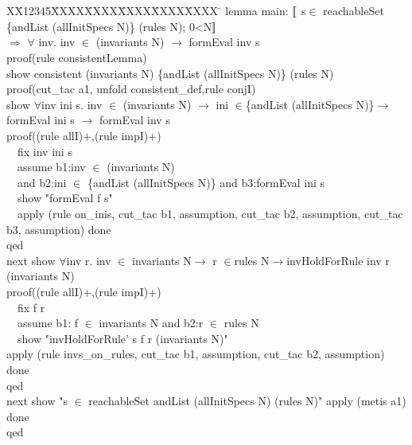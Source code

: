 \documentclass{llncs}
\newlength{\fminilength}
\newenvironment{fmini}[1][\linewidth]
  {\setlength{\fminilength}{#1\fboxsep-2\fboxrule}%
   \vspace{2ex}\noindent\begin{lrbox}{\fminibox}\begin{minipage}{\fminilength}%
   \mbox{ }\hfill\vspace{-2.5ex}}%
  {\end{minipage}\end{lrbox}\vspace{1ex}\hspace{0ex}%
   \framebox{\usebox{\fminibox}}}
\newenvironment{specification}
{\noindent\scriptsize
\tt\begin{fmini}\begin{tabbing}X\=X12345\=XXXX\=XXXX\=XXXX\=XXXX\=XXXX
\=\+\kill} {\end{tabbing}\normalfont\end{fmini}}
\def \twoSpaces {\ \ }
\begin{document}
\begin{specification}
lemma main:
  $\emph{$\mathopen{\lbrack\mkern-3mu\lbrack}$}$  s$\in$ reachableSet \{andList (allInitSpecs N)\} (rules N); 0<N$\emph{$\mathclose{\rbrack\mkern-3mu\rbrack}$}$\\
  $\Longrightarrow$ $\forall$ inv. inv $\in$ (invariants N) $\longrightarrow$ formEval inv s\\
proof(rule consistentLemma)\\
  show consistent (invariants N) \{andList (allInitSpecs N)\} (rules N)\\
 proof(cut\_tac a1, unfold consistent\_def,rule conjI)\\
   show  $\forall$inv ini s. inv $\in$ (invariants N)
$\longrightarrow$ ini $\in$\{andList (allInitSpecs N)\}$\longrightarrow$formEval
ini s $\longrightarrow$ formEval inv s\\
proof((rule allI)+,(rule impI)+)\\
\twoSpaces   fix inv ini s\\
\twoSpaces   assume b1:inv $\in$ (invariants N) \\
\twoSpaces     and b2:ini $\in$ \{andList (allInitSpecs N)\}  and b3:formEval ini s\\
\twoSpaces   show "formEval f s"\\
\twoSpaces   apply (rule on\_inis, cut\_tac b1, assumption, cut\_tac b2, assumption, cut\_tac b3, assumption) done\\
    qed\\

next   show  $\forall$inv r. inv $\in$ invariants N$\longrightarrow$
 r $\in$rules N$\longrightarrow$invHoldForRule inv r (invariants N) \\

   proof((rule allI)+,(rule impI)+)\\
\twoSpaces      fix f r \\
\twoSpaces         assume b1: f $\in$ invariants N  and b2:r $\in$ rules N\\

\twoSpaces     show "invHoldForRule' s f r (invariants N)"\\
  apply (rule invs\_on\_rules, cut\_tac b1, assumption, cut\_tac b2, assumption) done\\
qed\\
next show "s $\in$ reachableSet {andList (allInitSpecs N)} (rules N)"
  apply (metis a1) done\\
qed\\
\end{specification}
\end{document}
